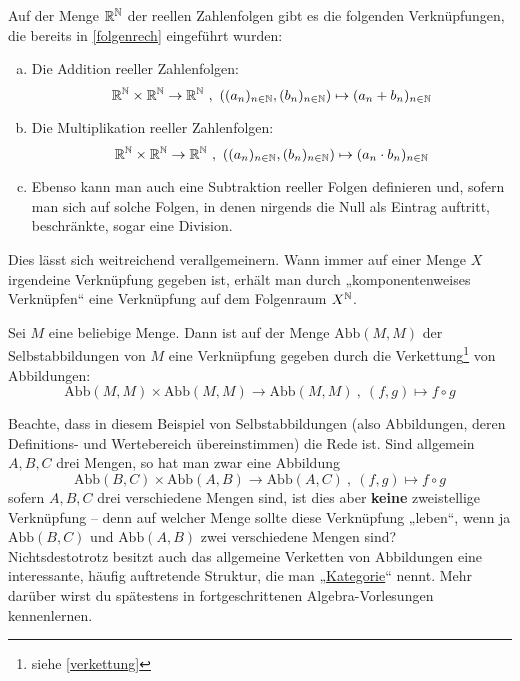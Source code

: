 \begin{bsp}
 Auf der Menge ${\mathbb R}^{\mathbb N}$ der reellen Zahlenfolgen gibt es die folgenden Verknüpfungen, die bereits in \cref{folgenrech} eingeführt wurden:
 \begin{enumerate}[a)]
  \item Die Addition reeller Zahlenfolgen:
  \[ \Rz^\Nz\times \Rz^\Nz \to \Rz^\Nz \ ,\ ((a_n)_{n\in \Nz} , (b_n)_{n\in \Nz}) \mapsto (a_n+b_n)_{n\in \Nz} \]
  \item Die Multiplikation reeller Zahlenfolgen:
    \[ \Rz^\Nz\times \Rz^\Nz \to \Rz^\Nz \ ,\ ((a_n)_{n\in \Nz} , (b_n)_{n\in \Nz}) \mapsto (a_n\cdot b_n)_{n\in \Nz} \]
\item Ebenso kann man auch eine Subtraktion reeller Folgen definieren und, sofern man sich auf solche Folgen, in denen nirgends die Null als Eintrag auftritt, beschränkte, sogar eine Division.
 \end{enumerate}
Dies lässt sich weitreichend verallgemeinern. Wann immer auf einer Menge $X$ irgendeine Verknüpfung gegeben ist, erhält man durch „komponentenweises Verknüpfen“ eine Verknüpfung auf dem Folgenraum $X^{\mathbb N}$.
\end{bsp}





\begin{bsp}
 Sei $M$ eine beliebige Menge. Dann ist auf der Menge $\text{Abb}(M,M)$ der Selbstabbildungen von $M$ eine Verknüpfung gegeben durch die Verkettung\footnote{siehe \cref{verkettung}} von Abbildungen:
 \[ \text{Abb}(M,M)\times \text{Abb}(M,M)\to \text{Abb}(M,M) \ ,\ (f,g)\mapsto f\circ g \]
\end{bsp}


\begin{bem}
 Beachte, dass in diesem Beispiel von Selbstabbildungen (also Abbildungen, deren Definitions- und Wertebereich übereinstimmen) die Rede ist. Sind allgemein $A,B,C$ drei Mengen, so hat man zwar eine Abbildung
 \[ \text{Abb}(B,C) \times \text{Abb}(A,B) \to \text{Abb}(A,C) \ ,\ (f,g) \mapsto f\circ g \]
 sofern $A,B,C$ drei verschiedene Mengen sind, ist dies aber \textbf{keine} zweistellige Verknüpfung -- denn auf welcher Menge sollte diese Verknüpfung „leben“, wenn ja $\text{Abb}(B,C)$ und $\text{Abb}(A,B)$ zwei verschiedene Mengen sind? \\[0.5em]
 Nichtsdestotrotz besitzt auch das allgemeine Verketten von Abbildungen eine interessante, häufig auftretende Struktur, die man „\href{https://ncatlab.org/nlab/show/category}{Kategorie}“ nennt. Mehr darüber wirst du spätestens in fortgeschrittenen Algebra-Vorlesungen kennenlernen.
\end{bem}




